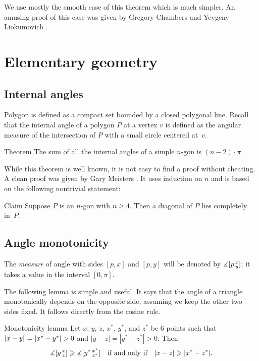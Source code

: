 We use mostly the smooth case of this theorem which is much simpler.
An amusing proof of this case was given by Gregory Chambers and Yevgeny Liokumovich \cite{chambers-liokumovich}.

\section{Elementary geometry}

\subsection*{Internal angles}

Polygon is defined as a compact set bounded by a closed polygonal line. 
Recall that the internal angle of a polygon $P$ at a vertex $v$
is defined as the angular measure of the intersection of $P$ with a small circle centered at~$v$.

\begin{thm}{Theorem}\label{thm:sum=(n-2)pi}
The sum of all the internal angles of a simple $n$-gon is $(n-2)\cdot\pi$. 
\end{thm}

While this theorem is well known, it is not easy to find a proof without cheating.
A clean proof was given by Gary Meisters \cite{meisters}.
It uses induction on $n$ and is based on the following nontrivial statement:

\begin{thm}{Claim}
Suppose $P$ is an $n$-gon with $n\ge 4$.
Then a diagonal of $P$ lies completely in~$P$.
\end{thm}



\subsection*{Angle monotonicity}

The {}\emph{measure} of angle with sides $[p,x]$ and $[p,y]$ will be denoted by $\measuredangle[p\,{}^{x}_{y}]$;
it takes a value in the interval $[0,\pi]$.

The following lemma is simple and useful.
It says that the angle of a triangle monotonically depends on the opposite side, assuming we keep the other two sides fixed.
It follows directly from the cosine rule.

\begin{thm}{Monotonicity lemma}\label{lem:angle-monotonicity}
Let $x$, $y$, $z$, $x^{*}$, $y^{*}$, and $z^{*}$ be 6 points such that $\dist{x}{y}{}\z=|x^{*}-y^{*}|>0$ and $|y-z|=|y^{*}-z^{*}|>0$.
Then 
\[\measuredangle[y\,{}^{x}_{z}]
\geqslant
\measuredangle[y^{*}\,{}^{x^{*}}_{z^{*}}]
\quad\text{if and only if}\quad
|x-z|\geqslant |x^{*}-z^{*}|.\]
\end{thm}

